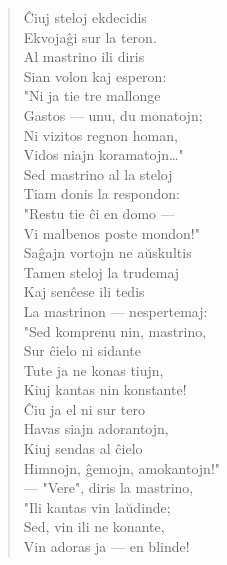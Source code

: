\begin{verse}
                        \^Ciuj steloj ekdecidis\\
                        Ekvoja\^gi sur la teron.\\
                        Al mastrino ili diris\\
                        Sian volon kaj esperon:\\
                        "Ni ja tie tre mallonge\\
                        Gastos --- unu, du monatojn;\\
                        Ni vizitos regnon homan,\\
                        Vidos niajn koramatojn\dots"\\
                        Sed mastrino al la steloj\\
                        Tiam donis la respondon:\\
                        "Restu tie \^ci en domo ---\\
                        Vi malbenos poste mondon!"\\
                        Sa\^gajn vortojn ne a\u uskultis\\
                        Tamen steloj la trudemaj\\
                        Kaj sen\^cese ili tedis\\
                        La mastrinon --- nespertemaj:\\
                        "Sed komprenu nin, mastrino,\\
                        Sur \^cielo ni sidante\\
                        Tute ja ne konas tiujn,\\
                        Kiuj kantas nin konstante!\\
                        \^Ciu ja el ni sur tero\\
                        Havas siajn adorantojn,\\
                        Kiuj sendas al \^cielo\\
                        Himnojn, \^gemojn, amokantojn!"\\
                        --- "Vere", diris la mastrino,\\
                        "Ili kantas vin la\u udinde;\\
                        Sed, vin ili ne konante,\\
                        Vin adoras ja --- en blinde!\\

\end{verse}
